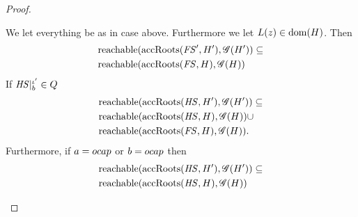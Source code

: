 \begin{proof}
\begin{description}
\begin{description}
\begin{description}
              \begin{lemma} \label{lem:2.15}
                We let everything be as in case \EAssign{} above. Furthermore we
                let $L(z) \in \mbox{$\mathrm{dom}$}(H)$. Then
                \begin{equation} \label{eq:lem2.15a}
                  \begin{aligned}
                    &\mbox{$\mathrm{reachable}$}(\mbox{$\mathrm{accRoots}$}(\mathit{FS}', H'), \mathscr{G}(H')) \subseteq \\
                    &\mbox{$\mathrm{reachable}$}(\mbox{$\mathrm{accRoots}$}(\mathit{FS}, H), \mathscr{G}(H))
                  \end{aligned}
                \end{equation}
                If $\mathit{HS}|_b^{\iota'} \in Q$
                \begin{equation}\label{eq:lem2.15b}
                  \begin{aligned}
                    &\mbox{$\mathrm{reachable}$}(\mbox{$\mathrm{accRoots}$}(\mathit{HS}, H'), \mathscr{G}(H')) \subseteq \\
                    &\mbox{$\mathrm{reachable}$}(\mbox{$\mathrm{accRoots}$}(\mathit{HS}, H), \mathscr{G}(H)) \cup  \\
                    &\mbox{$\mathrm{reachable}$}(\mbox{$\mathrm{accRoots}$}(\mathit{FS}, H), \mathscr{G}(H)).
                  \end{aligned}
                \end{equation}
                Furthermore, if $a = \mbox{$ocap$}$ or $b = \mbox{$ocap$}$ then
                \begin{equation}\label{eq:lem2.15c}
                  \begin{aligned}
                    &\mbox{$\mathrm{reachable}$}(\mbox{$\mathrm{accRoots}$}(\mathit{HS}, H'), \mathscr{G}(H')) \subseteq \\
                    &\mbox{$\mathrm{reachable}$}(\mbox{$\mathrm{accRoots}$}(\mathit{HS}, H), \mathscr{G}(H))
                  \end{aligned}
                \end{equation}
              \end{lemma}


\end{description}
\end{description}
\end{description}
\end{proof}
